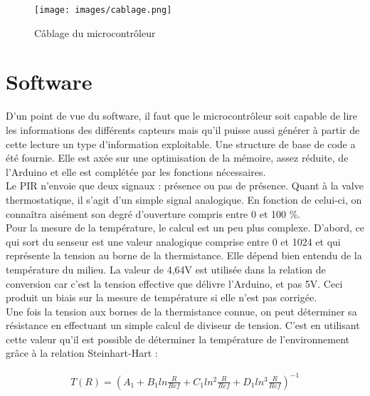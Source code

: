 \documentclass[11pt,a4paper,11pt]{report}
\begin{document}
\begin{figure}[h]
 \begin{center}
  \texttt{[image: images/cablage.png]}
  \caption{Câblage du microcontrôleur}
  \label{arduino_cablage}
 \end{center}
\end{figure}

\newpage

\section{Software}

D’un point de vue du software, il faut que le microcontrôleur soit capable de lire les informations des différents capteurs mais qu’il puisse aussi générer à partir de cette lecture un type d'information exploitable. Une structure de base de code a été fournie. Elle est axée sur une optimisation de la mémoire, assez réduite, de l’Arduino et elle est complétée par les fonctions nécessaires.\\ 

Le PIR n’envoie que deux signaux : présence ou pas de présence. Quant à la valve thermostatique, il s’agit d’un simple signal analogique. En fonction de celui-ci, on connaîtra aisément son degré d’ouverture compris entre 0 et 100 \%.\\

Pour la mesure de la température, le calcul est un peu plus complexe. D’abord, ce qui sort du senseur est une valeur analogique comprise entre 0 et 1024 et qui représente la tension au borne de la thermistance. Elle dépend bien entendu de la température du milieu. La valeur de 4,64V est utilisée dans la relation de conversion car c'est la tension effective que délivre l’Arduino, et pas 5V. Ceci produit un biais sur la mesure de température si elle n'est pas corrigée.\\

Une fois la tension aux bornes de la thermistance connue, on peut déterminer sa résistance en effectuant un simple calcul de diviseur de tension. C’est en utilisant cette valeur qu'il est possible de déterminer la température de l’environnement grâce à la relation Steinhart-Hart\cite{datash} :

\begin{align}
\label{steinhart}
 T(R) = (A_{1}+B_{1} ln \frac{R}{Ref} + C_{1} ln^{2}\frac{R}{Ref} + D_{1}ln^{3}\frac{R}{Ref})^{-1}
\end{align}
\end{document}

